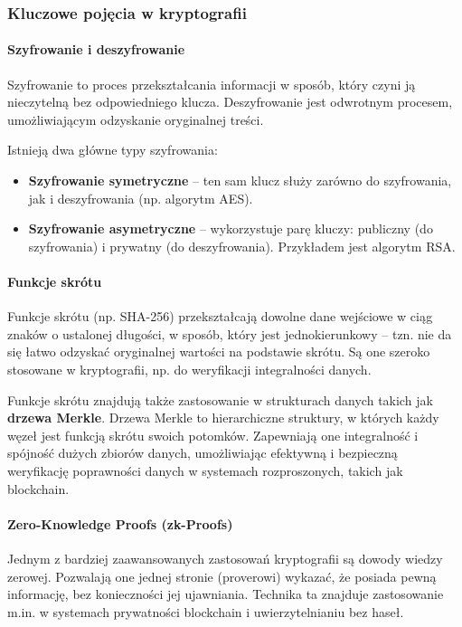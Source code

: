 \documentclass{article}
\begin{document}
\subsubsection{Kluczowe pojęcia w kryptografii}
\paragraph{Szyfrowanie i deszyfrowanie}
Szyfrowanie to proces przekształcania informacji w sposób, który czyni ją nieczytelną bez odpowiedniego klucza. 
Deszyfrowanie jest odwrotnym procesem, umożliwiającym odzyskanie oryginalnej treści.

Istnieją dwa główne typy szyfrowania:
\begin{itemize}
    \item \textbf{Szyfrowanie symetryczne} – ten sam klucz służy zarówno do szyfrowania, jak i deszyfrowania (np. algorytm AES).
    \item \textbf{Szyfrowanie asymetryczne} – wykorzystuje parę kluczy: publiczny (do szyfrowania) i prywatny (do deszyfrowania). 
    Przykładem jest algorytm RSA.
\end{itemize}

\paragraph{Funkcje skrótu}
Funkcje skrótu (np. SHA-256) przekształcają dowolne dane wejściowe w ciąg znaków o ustalonej długości, 
w sposób, który jest jednokierunkowy – tzn. nie da się łatwo odzyskać oryginalnej wartości na podstawie skrótu. 
Są one szeroko stosowane w kryptografii, np. do weryfikacji integralności danych. 

Funkcje skrótu znajdują także zastosowanie w strukturach danych takich jak \textbf{drzewa Merkle}. 
Drzewa Merkle to hierarchiczne struktury, w których każdy węzeł jest funkcją skrótu swoich potomków. 
Zapewniają one integralność i spójność dużych zbiorów danych, umożliwiając efektywną i bezpieczną weryfikację 
poprawności danych w systemach rozproszonych, takich jak blockchain.

\paragraph{Zero-Knowledge Proofs (zk-Proofs)}
Jednym z bardziej zaawansowanych zastosowań kryptografii są dowody wiedzy zerowej. 
Pozwalają one jednej stronie (proverowi) wykazać, że posiada pewną informację, bez konieczności jej ujawniania. 
Technika ta znajduje zastosowanie m.in. w systemach prywatności blockchain i uwierzytelnianiu bez haseł.
\end{document}
